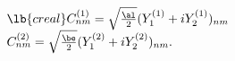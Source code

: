 \begin{equation}
\begin{array}{l}
\lb{creal}
C_{nm}^{(1)} = \sqrt{\al \over 2} (Y_1^{(1)} + i Y_2^{(1)})_{nm}\\
C_{nm}^{(2)} = \sqrt{\be \over 2} (Y_1^{(2)} + i Y_2^{(2)})_{nm}.
\end{array}
\end{equation}

